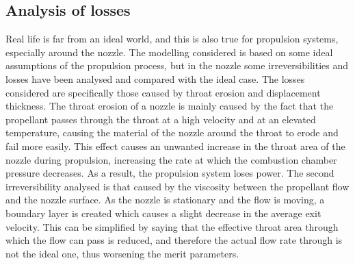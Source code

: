\subsection{Analysis of losses}
\label{subsec:losses_intro}
Real life is far from an ideal world, and this is also true for propulsion systems, especially around the nozzle. The modelling considered is based on some ideal assumptions of the propulsion process, but in the nozzle some irreversibilities and losses have been analysed and compared with the ideal case. The losses considered are specifically those caused by throat erosion and displacement thickness. The throat erosion of a nozzle is mainly caused by the fact that the propellant passes through the throat at a high velocity and at an elevated temperature, causing the material of the nozzle around the throat to erode and fail more easily. This effect causes an unwanted increase in the throat area of the nozzle during propulsion, increasing the rate at which the combustion chamber pressure decreases. As a result, the propulsion system loses power. The second irreversibility analysed is that caused by the viscosity between the propellant flow and the nozzle surface. As the nozzle is stationary and the flow is moving, a boundary layer is created which causes a slight decrease in the average exit velocity. This can be simplified by saying that the effective throat area through which the flow can pass is reduced, and therefore the actual flow rate through is not the ideal one, thus worsening the merit parameters.